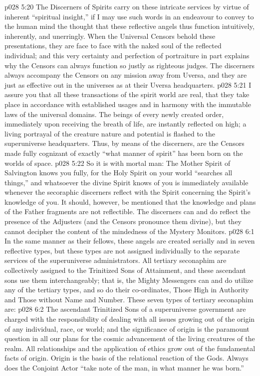 \vs p028 5:20 The Discerners of Spirits carry on these intricate services by virtue of inherent “spiritual insight,” if I may use such words in an endeavour to convey to the human mind the thought that these reflective angels thus function intuitively, inherently, and unerringly. When the Universal Censors behold these presentations, they are face to face with the naked soul of the reflected individual; and this very certainty and perfection of portraiture in part explains why the Censors can always function so justly as righteous judges. The discerners always accompany the Censors on any mission away from Uversa, and they are just as effective out in the universes as at their Uversa headquarters.
\vs p028 5:21 I assure you that all these transactions of the spirit world are real, that they take place in accordance with established usages and in harmony with the immutable laws of the universal domains. The beings of every newly created order, immediately upon receiving the breath of life, are instantly reflected on high; a living portrayal of the creature nature and potential is flashed to the superuniverse headquarters. Thus, by means of the discerners, are the Censors made fully cognizant of exactly “what manner of spirit” has been born on the worlds of space.
\vs p028 5:22 So it is with mortal man: The Mother Spirit of Salvington knows you fully, for the Holy Spirit on your world “searches all things,” and whatsoever the divine Spirit knows of you is immediately available whenever the secoraphic discerners reflect with the Spirit concerning the Spirit’s knowledge of you. It should, however, be mentioned that the knowledge and plans of the Father fragments are not reflectible. The discerners can and do reflect the presence of the Adjusters (and the Censors pronounce them divine), but they cannot decipher the content of the mindedness of the Mystery Monitors.
\vs p028 6:1 In the same manner as their fellows, these angels are created serially and in seven reflective types, but these types are not assigned individually to the separate services of the superuniverse administrators. All tertiary seconaphim are collectively assigned to the Trinitized Sons of Attainment, and these ascendant sons use them interchangeably; that is, the Mighty Messengers can and do utilize any of the tertiary types, and so do their co\hyp{}ordinates, Those High in Authority and Those without Name and Number. These seven types of tertiary seconaphim are:
\vs p028 6:2 \bibnobreakspace {} The ascendant Trinitized Sons of a superuniverse government are charged with the responsibility of dealing with all issues growing out of the origin of any individual, race, or world; and the significance of origin is the paramount question in all our plans for the cosmic advancement of the living creatures of the realm. All relationships and the application of ethics grow out of the fundamental facts of origin. Origin is the basis of the relational reaction of the Gods. Always does the Conjoint Actor “take note of the man, in what manner he was born.”
